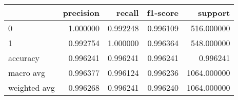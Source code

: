 \begin{tabular}{lrrrr}
\toprule
{} &  precision &    recall &  f1-score &      support \\
\midrule
0            &   1.000000 &  0.992248 &  0.996109 &   516.000000 \\
1            &   0.992754 &  1.000000 &  0.996364 &   548.000000 \\
accuracy     &   0.996241 &  0.996241 &  0.996241 &     0.996241 \\
macro avg    &   0.996377 &  0.996124 &  0.996236 &  1064.000000 \\
weighted avg &   0.996268 &  0.996241 &  0.996240 &  1064.000000 \\
\bottomrule
\end{tabular}

